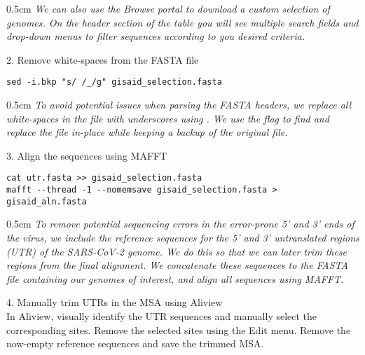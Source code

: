 \documentclass{article}
\newcommand{\ann}[1]{
\begin{adjustwidth}{0.5cm}{}
\it{#1}\\
\end{adjustwidth}}
\newcommand{\code}[1]{
{\upshape\ttfamily{#1}}}
\begin{document}
\ann{We can also use the \code{EpiCoV} Browse portal to download a custom selection of genomes. On the header section of the table you will see multiple search fields and drop-down menus to filter sequences according to you desired criteria.}

2. Remove white-spaces from the FASTA file %
\begin{verbatim}
sed -i.bkp "s/ /_/g" gisaid_selection.fasta 
\end{verbatim}

\ann{To avoid potential issues when parsing the FASTA headers, we replace all white-spaces in the file with underscores using \code{sed}.  We use the \code{-i} flag to find and replace the file in-place while keeping a backup of the original file.}

3. Align the sequences using MAFFT
\begin{verbatim}
cat utr.fasta >> gisaid_selection.fasta
mafft --thread -1 --nomemsave gisaid_selection.fasta > gisaid_aln.fasta
\end{verbatim}

\ann{To remove potential sequencing errors in the error-prone 5' and 3' ends of the virus, we include the reference sequences for the 5' and 3' untranslated regions (UTR) of the SARS-CoV-2 genome.
We do this so that we can later trim these regions from the final alignment.
We concatenate these sequences to the FASTA file containing our genomes of interest, and align all sequences using MAFFT.} %

4. Manually trim UTRs in the MSA using Aliview\\

In Aliview, visually identify the UTR sequences and manually select the corresponding sites. Remove the selected sites using the Edit menu. %
Remove the now-empty reference sequences and save the trimmed MSA.\\ %
\end{document}

